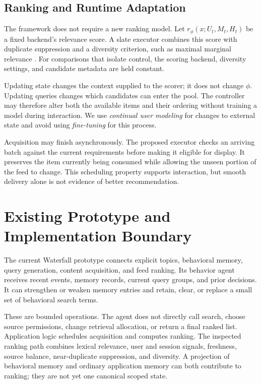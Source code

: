 \documentclass[11pt]{article}
\begin{document}
\subsection{Ranking and Runtime Adaptation}

The framework does not require a new ranking model. Let $r_\phi(x;U_t,M_t,H_t)$ be a fixed backend's relevance score. A slate executor combines this score with duplicate suppression and a diversity criterion, such as maximal marginal relevance \citep{carbonell1998mmr}. For comparisons that isolate control, the scoring backend, diversity settings, and candidate metadata are held constant.

Updating state changes the context supplied to the scorer; it does not change $\phi$. Updating queries changes which candidates can enter the pool. The controller may therefore alter both the available items and their ordering without training a model during interaction. We use \emph{continual user modeling} for changes to external state and avoid using \emph{fine-tuning} for this process.

Acquisition may finish asynchronously. The proposed executor checks an arriving batch against the current requirements before making it eligible for display. It preserves the item currently being consumed while allowing the unseen portion of the feed to change. This scheduling property supports interaction, but smooth delivery alone is not evidence of better recommendation.

\section{Existing Prototype and Implementation Boundary}
\label{sec:prototype}

The current Waterfall prototype connects explicit topics, behavioral memory, query generation, content acquisition, and feed ranking. Its behavior agent receives recent events, memory records, current query groups, and prior decisions. It can strengthen or weaken memory entries and retain, clear, or replace a small set of behavioral search terms.

These are bounded operations. The agent does not directly call search, choose source permissions, change retrieval allocation, or return a final ranked list. Application logic schedules acquisition and computes ranking. The inspected ranking path combines lexical relevance, user and session signals, freshness, source balance, near-duplicate suppression, and diversity. A projection of behavioral memory and ordinary application memory can both contribute to ranking; they are not yet one canonical scoped state.
\end{document}
